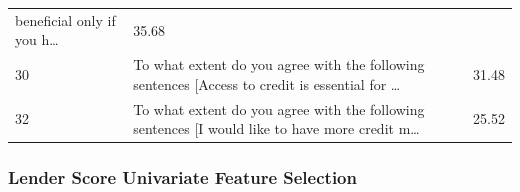 \begin{longtable}[]{@{}lll@{}}
\begin{minipage}[t]{0.77\columnwidth}
beneficial only if you h\ldots{}\strut
\end{minipage} & \begin{minipage}[t]{0.09\columnwidth}\raggedright
35.68\strut
\end{minipage}\tabularnewline
\begin{minipage}[t]{0.05\columnwidth}\raggedright
30\strut
\end{minipage} & \begin{minipage}[t]{0.77\columnwidth}\raggedright
To what extent do you agree with the following sentences {[}Access to
credit is essential for \ldots{}\strut
\end{minipage} & \begin{minipage}[t]{0.09\columnwidth}\raggedright
31.48\strut
\end{minipage}\tabularnewline
\begin{minipage}[t]{0.05\columnwidth}\raggedright
32\strut
\end{minipage} & \begin{minipage}[t]{0.77\columnwidth}\raggedright
To what extent do you agree with the following sentences {[}I would like
to have more credit m\ldots{}\strut
\end{minipage} & \begin{minipage}[t]{0.09\columnwidth}\raggedright
25.52\strut
\end{minipage}\tabularnewline
\bottomrule
\end{longtable}

\hypertarget{lender-score-univariate-feature-selection}{%
\subsubsection{Lender Score Univariate Feature
Selection}\label{lender-score-univariate-feature-selection}}

